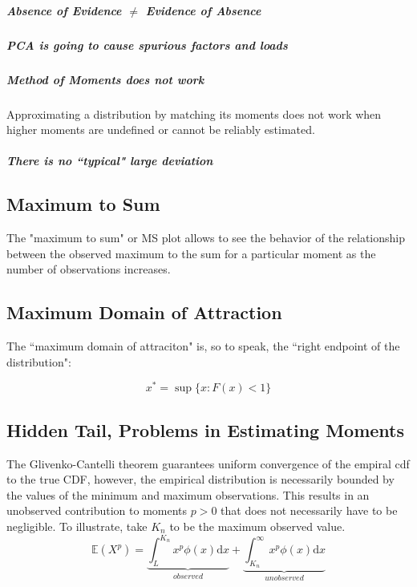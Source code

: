\subparagraph{Absence of Evidence $\neq$ Evidence of Absence}

\subparagraph{PCA is going to cause spurious factors and loads}

\subparagraph{Method of Moments does not work}
Approximating a distribution by matching its moments does not work when higher moments are undefined or cannot be reliably estimated.

\subparagraph{There is no ``typical" large deviation}


\subsection{Maximum to Sum}
The "maximum to sum" or MS plot allows to see the behavior of the relationship between the observed maximum to the sum for a particular moment as the number of observations increases. 

\subsection{Maximum Domain of Attraction}

The ``maximum domain of attraciton" is, so to speak, the ``right endpoint of the distribution":

\begin{equation}
x^* = \sup\{x: F(x) < 1 \}
\end{equation}

\subsection{Hidden Tail, Problems in Estimating Moments}
The Glivenko-Cantelli theorem guarantees uniform convergence of the empiral cdf to the true CDF, however, the empirical distribution is necessarily bounded by the values of the minimum and maximum observations. This results in an unobserved contribution to moments $p>0$ that does not necessarily have to be negligible. To illustrate, take $K_n$ to be the maximum observed value. 
\begin{equation}
\mathbb{E}(X^p) = \underbrace{\int_{L}^{K_n} x^p \phi(x)\mathrm{d}x}_{observed} + \underbrace{\int_{K_n}^{\infty} x^p \phi(x)\mathrm{d}x}_{unobserved}
\end{equation}


